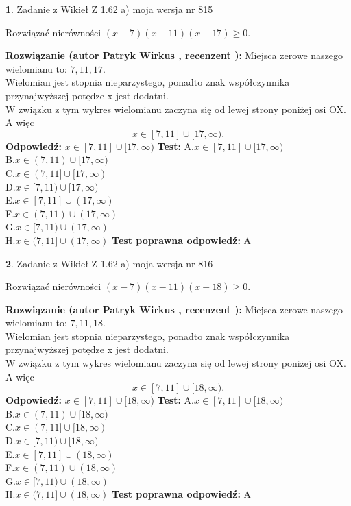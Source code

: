\documentclass[12pt, a4paper]{article}
\theoremstyle{definition} %
\newtheorem{zad}{}
\newcommand{\zadStart}[1]{\begin{zad}#1\newline}
\newcommand{\zadStop}{\end{zad}}
\newcommand{\rozwStart}[2]{\noindent \textbf{Rozwiązanie (autor #1 , recenzent #2): }\newline}
\newcommand{\rozwStop}{\newline}
\newcommand{\odpStart}{\noindent \textbf{Odpowiedź:}\newline}
\newcommand{\odpStop}{\newline}
\newcommand{\testStart}{\noindent \textbf{Test:}\newline}
\newcommand{\testStop}{\newline}
\newcommand{\kluczStart}{\noindent \textbf{Test poprawna odpowiedź:}\newline}
\newcommand{\kluczStop}{\newline}
\begin{document}
\zadStart{Zadanie z Wikieł Z 1.62 a) moja wersja nr 815}

Rozwiązać nierówności $(x-7)(x-11)(x-17)\ge0$.
\zadStop
\rozwStart{Patryk Wirkus}{}
Miejsca zerowe naszego wielomianu to: $7, 11, 17$.\\
Wielomian jest stopnia nieparzystego, ponadto znak współczynnika przy\linebreak najwyższej potędze x jest dodatni.\\ W związku z tym wykres wielomianu zaczyna się od lewej strony poniżej osi OX. A więc $$x \in [7,11] \cup [17,\infty).$$
\rozwStop
\odpStart
$x \in [7,11] \cup [17,\infty)$
\odpStop
\testStart
A.$x \in [7,11] \cup [17,\infty)$\\
B.$x \in (7,11) \cup [17,\infty)$\\
C.$x \in (7,11] \cup [17,\infty)$\\
D.$x \in [7,11) \cup [17,\infty)$\\
E.$x \in [7,11] \cup (17,\infty)$\\
F.$x \in (7,11) \cup (17,\infty)$\\
G.$x \in [7,11) \cup (17,\infty)$\\
H.$x \in (7,11] \cup (17,\infty)$
\testStop
\kluczStart
A
\kluczStop



\zadStart{Zadanie z Wikieł Z 1.62 a) moja wersja nr 816}

Rozwiązać nierówności $(x-7)(x-11)(x-18)\ge0$.
\zadStop
\rozwStart{Patryk Wirkus}{}
Miejsca zerowe naszego wielomianu to: $7, 11, 18$.\\
Wielomian jest stopnia nieparzystego, ponadto znak współczynnika przy\linebreak najwyższej potędze x jest dodatni.\\ W związku z tym wykres wielomianu zaczyna się od lewej strony poniżej osi OX. A więc $$x \in [7,11] \cup [18,\infty).$$
\rozwStop
\odpStart
$x \in [7,11] \cup [18,\infty)$
\odpStop
\testStart
A.$x \in [7,11] \cup [18,\infty)$\\
B.$x \in (7,11) \cup [18,\infty)$\\
C.$x \in (7,11] \cup [18,\infty)$\\
D.$x \in [7,11) \cup [18,\infty)$\\
E.$x \in [7,11] \cup (18,\infty)$\\
F.$x \in (7,11) \cup (18,\infty)$\\
G.$x \in [7,11) \cup (18,\infty)$\\
H.$x \in (7,11] \cup (18,\infty)$
\testStop
\kluczStart
A
\kluczStop
\end{document}
